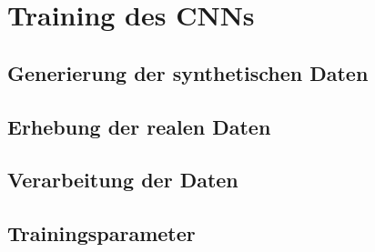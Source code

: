 
\section{Training des CNNs}

\subsection{Generierung der synthetischen Daten}
\subsection{Erhebung der realen Daten}
\subsection{Verarbeitung der Daten}
\subsection{Trainingsparameter}